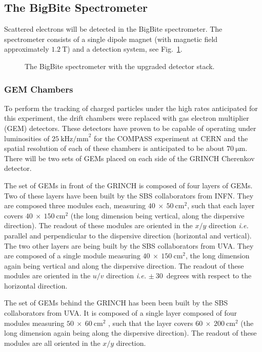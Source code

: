 \subsection{The BigBite Spectrometer}
%
\label{sec:expsetup_bigbite}             
%
Scattered electrons will be detected in the BigBite spectrometer.
The spectrometer consists of a single dipole magnet (with magnetic field approximately $1.2~\mathrm{T}$) and a detection system, see Fig.~\ref{fig:BB}.  

\begin{figure}[htbp]
\begin{center}
\end{center}
\caption{The BigBite spectrometer with the upgraded detector stack.}
\label{fig:BB}
\end{figure} 

\subsubsection{GEM Chambers}
To perform the tracking of charged particles under the high rates anticipated for this experiment, the drift chambers were replaced with gas electron multiplier (GEM) detectors.  
These detectors have proven to be capable of operating under luminosities of $25~\mathrm{kHz/mm}^2$ for the COMPASS experiment at CERN and the spatial resolution of each of these chambers is anticipated to be about $70~\mathrm{\mu m}$.
There will be two sets of GEMs placed on each side of the GRINCH Cherenkov detector.

The set of GEMs in front of the GRINCH is composed of four layers of GEMs.
Two of these layers have been built by the SBS collaborators from INFN.
They are composed three modules each, measuring $40~\times~50~\mathrm{cm}^2$, such that each layer covers $40~\times~150~\mathrm{cm}^2$ (the long dimension being vertical, along the dispersive direction). The readout of these modules are oriented in the $x/y$ direction {\it i.e.} parallel and perpendicular to the dispersive direction (horizontal and vertical).
The two other layers are being built by the SBS collaborators from UVA. They are composed of a single module measuring $40~\times~150~\mathrm{cm}^2$, the long dimension again being vertical and along the dispersive direction.
The readout of these modules are oriented in the $u/v$ direction {\it i.e.} $\pm~30$~degrees with respect to the horizontal direction.

The set of GEMs behind the GRINCH has been been built by the SBS collaborators from UVA. It is composed of a single layer composed of four modules measuring $50~\times~60~\mathrm{cm}^2$ , such that the layer covers $60~\times~200~\mathrm{cm}^2$ (the long dimension again being along the dispersive direction).
The readout of these modules are all oriented in the $x/y$ direction.

